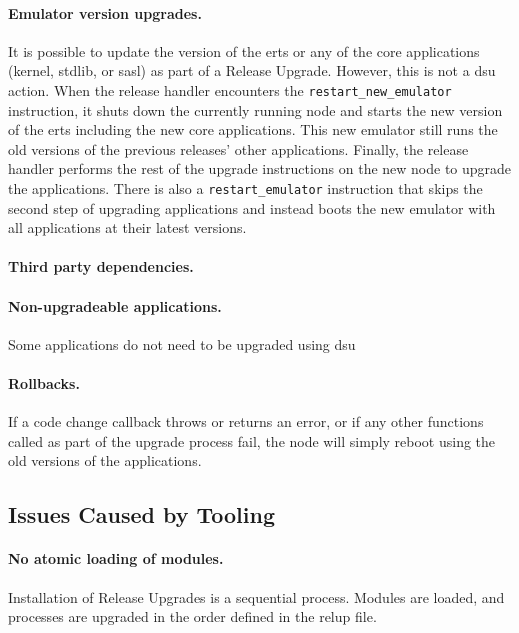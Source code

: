 \paragraph{Emulator version upgrades.} It is possible to update the version of the \acrfull{erts} or any of the core applications (kernel, stdlib, or sasl) as part of a Release Upgrade. However, this is not a \acrshort{dsu} action. When the release handler encounters the \lstinline|restart_new_emulator| instruction, it shuts down the currently running node and starts the new version of the \acrshort{erts} including the new core applications. This new emulator still runs the old versions of the previous releases' other applications. Finally, the release handler performs the rest of the upgrade instructions on the new node to upgrade the applications. There is also a \lstinline|restart_emulator| instruction that skips the second step of upgrading applications and instead boots the new emulator with all applications at their latest versions.

\paragraph{Third party dependencies.}


\paragraph{Non-upgradeable applications.}
Some applications do not need to be upgraded using \acrshort{dsu}



\paragraph{Rollbacks.} If a code change callback throws or returns an error, or if any other functions called as part of the upgrade process fail, the node will simply reboot using the old versions of the applications.




\subsection{Issues Caused by Tooling}

\paragraph{No atomic loading of modules.}
Installation of Release Upgrades is a sequential process. Modules are loaded, and processes are upgraded in the order defined in the \acrshort{relup} file.

